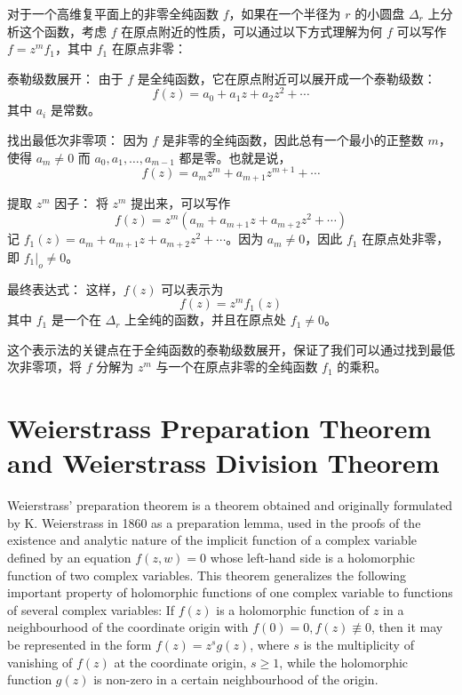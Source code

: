\documentclass[lang=cn,12pt,fontset=none,a4paper]{beautybook}
\begin{document}
\begin{solution}
   对于一个高维复平面上的非零全纯函数 \( f \)，如果在一个半径为 \( r \) 的小圆盘 \( \Delta_r \) 上分析这个函数，考虑 \( f \) 在原点附近的性质，可以通过以下方式理解为何 \( f \) 可以写作 \( f = z^m f_1 \)，其中 \( f_1 \) 在原点非零：

泰勒级数展开：
   由于 \( f \) 是全纯函数，它在原点附近可以展开成一个泰勒级数：
   \[
   f(z) = a_0 + a_1 z + a_2 z^2 + \cdots
   \]
   其中 \( a_i \) 是常数。

找出最低次非零项：
   因为 \( f \) 是非零的全纯函数，因此总有一个最小的正整数 \( m \)，使得 \( a_m \neq 0 \) 而 \( a_0, a_1, \ldots, a_{m-1} \) 都是零。也就是说，
   \[
   f(z) = a_m z^m + a_{m+1} z^{m+1} + \cdots
   \]

提取 \( z^m \) 因子：
   将 \( z^m \) 提出来，可以写作
   \[
   f(z) = z^m (a_m + a_{m+1} z + a_{m+2} z^2 + \cdots)
   \]
   记 \( f_1(z) = a_m + a_{m+1} z + a_{m+2} z^2 + \cdots \)。因为 \( a_m \neq 0 \)，因此 \( f_1 \) 在原点处非零，即 \( f_1|_o \neq 0 \)。

最终表达式：
   这样，\( f(z) \) 可以表示为
   \[
   f(z) = z^m f_1(z)
   \]
   其中 \( f_1 \) 是一个在 \( \Delta_r \) 上全纯的函数，并且在原点处 \( f_1 \neq 0 \)。

这个表示法的关键点在于全纯函数的泰勒级数展开，保证了我们可以通过找到最低次非零项，将 \( f \) 分解为 \( z^m \) 与一个在原点非零的全纯函数 \( f_1 \) 的乘积。
\end{solution}


\section{Weierstrass Preparation Theorem and Weierstrass Division Theorem}

Weierstrass' preparation theorem is a theorem obtained and originally formulated by K. Weierstrass in 1860 as a preparation lemma, used in the proofs of the existence and analytic nature of the implicit function of a complex variable defined by an equation $f(z,w)=0$ whose left-hand side is a holomorphic function of two complex variables. This theorem generalizes the following important property of holomorphic functions of one complex variable to functions of several complex variables: If $f(z)$ is a holomorphic function of $z$ in a neighbourhood of the coordinate origin with $f(0)=0, f(z)\not\equiv 0$, then it may be represented in the form $f(z)=z^s g(z)$, where $s$ is the multiplicity of vanishing of $f(z)$ at the coordinate origin, $s\geq 1$, while the holomorphic function $g(z)$ is non-zero in a certain neighbourhood of the origin.
\end{document}
